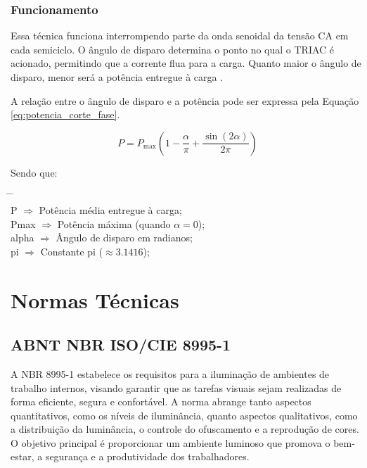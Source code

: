 \subsubsection{Funcionamento}

Essa técnica funciona interrompendo parte da onda senoidal da tensão \gls{CA} em cada semiciclo. O ângulo de disparo determina o ponto no qual o \gls{TRIAC} é acionado, permitindo que a corrente flua para a carga. Quanto maior o ângulo de disparo, menor será a potência entregue à carga \cite{Rashid2014}.

A relação entre o ângulo de disparo e a potência pode ser expressa pela Equação \ref{eq:potencia_corte_fase}.

\begin{equation}
     P = P_{\text{max}} \left(1 - \frac{\alpha}{\pi} + \frac{\sin(2\alpha)}{2\pi}\right)
    \label{eq:potencia_corte_fase}
\end{equation}

Sendo que:\\
\vspace{-1.5cm}
\begin{tabbing}
    \hspace{1cm}  \= \hspace{1cm} \= \kill \\
    \gls{P}       \> \(\Rightarrow\) \> Potência média entregue à carga; \\
    \gls{Pmax} \> \(\Rightarrow\) \> Potência máxima (quando \(\alpha = 0\)); \\
    \gls{alpha}    \> \(\Rightarrow\) \> Ângulo de disparo em radianos; \\
    \gls{pi}     \> \(\Rightarrow\) \> Constante pi (\(\approx 3.1416\)); \\
\end{tabbing}



\section{Normas Técnicas}

\subsection{ABNT NBR ISO/CIE 8995-1}

A \gls{NBR} 8995-1 \cite{ISOCIE} estabelece os requisitos para a iluminação de ambientes de trabalho internos, visando garantir que as tarefas visuais sejam realizadas de forma eficiente, segura e confortável. A norma abrange tanto aspectos quantitativos, como os níveis de iluminância, quanto aspectos qualitativos, como a distribuição da luminância, o controle do ofuscamento e a reprodução de cores. O objetivo principal é proporcionar um ambiente luminoso que promova o bem-estar, a segurança e a produtividade dos trabalhadores.

